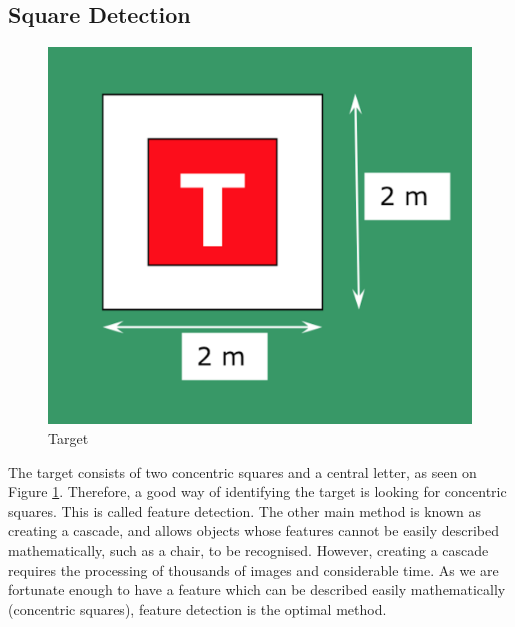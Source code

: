 \documentclass[11pt,twoside]{article}
\begin{document}
\subsection{Square Detection}
\begin{figure}
    \begin{center}
        \includegraphics[width=0.48\linewidth]{IMechE_target}
        \caption{Target}
        \label{fig:target}
    \end{center}
\end{figure}

The target consists of two concentric squares and a central letter, as seen on Figure \ref{fig:target}\cite{IMechE_rules}. Therefore, a good way of identifying the target is looking for concentric squares. This is called feature detection. The other main method is known as creating a cascade, and allows objects whose features cannot be easily described mathematically, such as a chair, to be recognised. However, creating a cascade requires the processing of thousands of images and considerable time. As we are fortunate enough to have a feature which can be described easily mathematically (concentric squares), feature detection is the optimal method.
\end{document}

